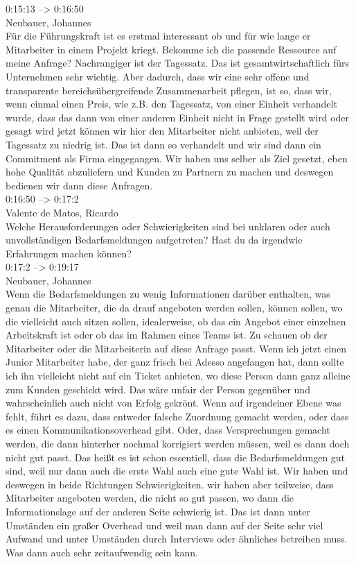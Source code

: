 0:15:13 --> 0:16:50\\
Neubauer, Johannes\\
Für die Führungskraft ist es erstmal interessant ob und für wie lange er Mitarbeiter in einem Projekt kriegt. Bekomme ich die passende Ressource auf meine Anfrage? Nachrangiger ist der Tagessatz. Das ist gesamtwirtschaftlich fürs Unternehmen sehr wichtig. Aber dadurch, dass wir eine sehr offene und transparente bereichsübergreifende Zusammenarbeit pflegen, ist so, dass wir, wenn einmal einen Preis, wie z.B. den Tagessatz, von einer Einheit verhandelt wurde, dass das dann von einer anderen Einheit nicht in Frage gestellt wird oder gesagt wird jetzt können wir hier den Mitarbeiter nicht anbieten, weil der Tagessatz zu niedrig ist. Das ist dann so verhandelt und wir sind dann ein Commitment als Firma eingegangen. Wir haben uns selber als Ziel gesetzt, eben hohe Qualität abzuliefern und Kunden zu Partnern zu machen und deswegen bedienen wir dann diese Anfragen.\\

0:16:50 --> 0:17:2\\
Valente de Matos, Ricardo\\
Welche Herausforderungen oder Schwierigkeiten sind bei unklaren oder auch unvollständigen Bedarfsmeldungen aufgetreten? Hast du da irgendwie Erfahrungen machen können?\\

0:17:2 --> 0:19:17\\
Neubauer, Johannes\\
Wenn die Bedarfsmeldungen zu wenig Informationen darüber enthalten, was genau die Mitarbeiter, die da drauf angeboten werden sollen, können sollen, wo die vielleicht auch sitzen sollen, idealerweise, ob das ein Angebot einer einzelnen Arbeitskraft ist oder ob das im Rahmen eines Teams ist. Zu schauen ob der Mitarbeiter oder die Mitarbeiterin auf diese Anfrage passt. Wenn ich jetzt einen Junior Mitarbeiter habe, der ganz frisch bei Adesso angefangen hat, dann sollte ich ihn vielleicht nicht auf ein Ticket anbieten, wo diese Person dann ganz alleine zum Kunden geschickt wird. Das wäre unfair der Person gegenüber und wahrscheinlich auch nicht von Erfolg gekrönt. Wenn auf irgendeiner Ebene was fehlt, führt es dazu, dass entweder falsche Zuordnung gemacht werden, oder dass es einen Kommunikationsoverhead gibt. Oder, dass Versprechungen gemacht werden, die dann hinterher nochmal korrigiert werden müssen, weil es dann doch nicht gut passt. Das heißt es ist schon essentiell, dass die Bedarfsmeldungen gut sind, weil nur dann auch die erste Wahl auch eine gute Wahl ist. Wir haben und deswegen in beide Richtungen Schwierigkeiten. wir haben aber teilweise, dass Mitarbeiter angeboten werden, die nicht so gut passen, wo dann die Informationslage auf der anderen Seite schwierig ist. Das ist dann unter Umständen ein großer Overhead und weil man dann auf der Seite sehr viel Aufwand und unter Umständen durch Interviews oder ähnliches betreiben muss. Was dann auch sehr zeitaufwendig sein kann.\\

